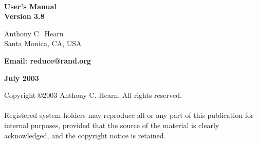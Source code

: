 \vspace*{2.0in}
\begin{center}

{\Huge\bf {\REDUCE}} \\ [0.2cm]
{\LARGE\bf User's Manual\vspace{0.4cm} \\
  Version 3.8}

\vspace{0.5in}\large\bf

Anthony C.\ Hearn \\
Santa Monica, CA, USA

\vspace{0.1in}

\bf Email: reduce@rand.org

\vspace{0.5in}

\large\bf July 2003

\end{center}

\newpage
\vspace*{3.0in}
\noindent Copyright \copyright 2003 Anthony C. Hearn.  All rights reserved. \\
\mbox{}\\
%
\noindent Registered system holders may reproduce all or any part of this
publication for internal purposes, provided that the source of the
material is clearly acknowledged, and the copyright notice is retained.

\pagestyle{headings}

